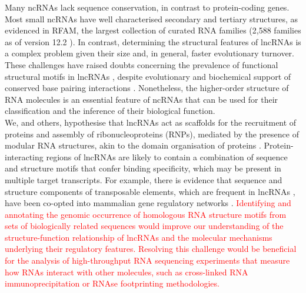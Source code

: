 \documentclass{bmcart}
\begin{document}
Many ncRNAs lack sequence conservation, in contrast to protein-coding genes.
Most small ncRNAs have well characterised secondary and tertiary structures, as
evidenced in RFAM, the largest collection of curated RNA families (2,588
families as of version 12.2 \cite{rfam12}). In contrast, determining the
structural features of lncRNAs is a complex problem given their size and, in
general, faster evolutionary turnover. These challenges have raised doubts
concerning the prevalence of functional structural  motifs in lncRNAs
\cite{eddy2014computational,rivas2016statistical}, despite evolutionary and
biochemical support of conserved base pairing interactions
\cite{smith2013widespread,spitale2015structural,lu2016rna}.
Nonetheless, the higher-order structure of RNA molecules is an essential feature 
of ncRNAs that can be used for their classification and the inference of their biological function. \\

We, and others, hypothesise that lncRNAs act as scaffolds for the recruitment of proteins and assembly of
ribonucleoproteins (RNPs), mediated by the presence of modular RNA structures,
akin to the domain organisation of proteins
\cite{zappulla2006rna,hogg2008structured,rinn2012genome,mercer2013structure,smith2013widespread,chujo2016architectural,blythe2016ins}.
Protein-interacting regions of lncRNAs are likely to contain a combination of
sequence and structure motifs that confer binding specificity, which may 
be present in multiple target transcripts. For example, there is evidence that 
sequence and structure components of transposable elements, 
which are frequent in lncRNAs \cite{kapusta2013transposable,hezroni2015principles}, 
have been co-opted into mammalian gene regulatory networks \cite{kunarso2010transposable,kelley2012transposable}. 
\textcolor{red}{ Identifying and annotating the genomic occurrence of homologous 
RNA structure motifs from sets of biologically related sequences would improve our
understanding of the structure-function relationship of lncRNAs and the
molecular mechanisms underlying their regulatory features. Resolving this challenge 
would be beneficial for the analysis of high-throughput RNA sequencing experiments 
that measure how RNAs interact with other molecules, such as cross-linked 
RNA immunoprecipitation or RNAse footprinting methodologies. } \\
\end{document}
